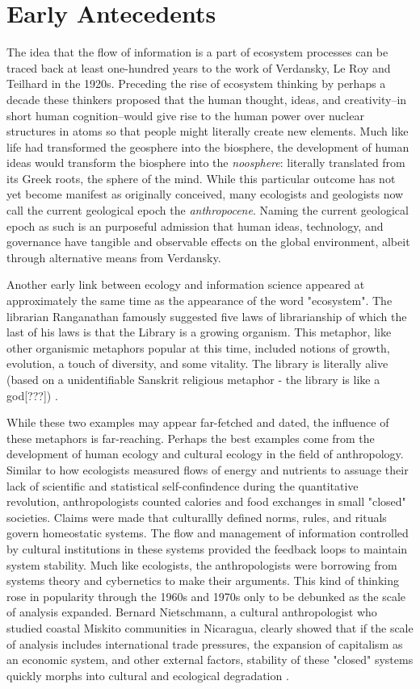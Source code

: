 \section{Early Antecedents}

The idea that the flow of information is a part of ecosystem processes can be traced back at least one-hundred years to the work of Verdansky, Le Roy and Teilhard in the 1920s. Preceding the rise of ecosystem thinking by perhaps a decade these thinkers proposed that the human thought, ideas, and creativity--in short human cognition--would give rise to the human power over nuclear structures in atoms so that people might literally create new elements. Much like life had transformed the geosphere into the biosphere, the development of human ideas would transform the biosphere into the \textit{noosphere}: literally translated from its Greek roots, the sphere of the mind. While this particular outcome has not yet become manifest as originally conceived, many ecologists and geologists now call the current geological epoch the \textit{anthropocene}. Naming the current geological epoch as such is an purposeful admission that human ideas, technology, and governance have tangible and observable effects on the global environment, albeit through alternative means from Verdansky. 

Another early link between ecology and information science appeared at approximately the same time as the appearance of the word "ecosystem". The librarian Ranganathan famously suggested five laws of librarianship of which the last of his laws is that the Library is a growing organism. This metaphor, like other organismic metaphors popular at this time, included notions of growth, evolution, a touch of diversity, and some vitality. The library is literally alive (based on a unidentifiable Sanskrit religious metaphor - the library is like a god[???]) \citep{ranganathan_1931}.

While these two examples may appear far-fetched and dated, the influence of these metaphors is far-reaching. Perhaps the best examples come from the development of human ecology and cultural ecology in the field of anthropology. Similar to how ecologists measured flows of energy and nutrients to assuage their lack of scientific and statistical self-confindence during the quantitative revolution, anthropologists counted calories and food exchanges in small "closed" societies. Claims were made that culturallly defined norms, rules, and rituals govern homeostatic systems. The flow and management of information controlled by cultural institutions in these systems provided the feedback loops to maintain system stability. Much like ecologists, the anthropologists were borrowing from systems theory and cybernetics to make their arguments. This kind of thinking rose in popularity through the 1960s and 1970s only to be debunked as the scale of analysis expanded. Bernard Nietschmann, a cultural anthropologist who studied coastal Miskito communities in Nicaragua, clearly showed that if the scale of analysis includes international trade pressures, the expansion of capitalism as an economic system, and other external factors, stability of these "closed" systems quickly morphs into cultural and ecological degradation \citep{nietschmannn_1973}.


